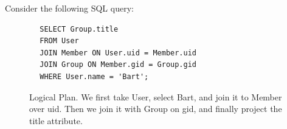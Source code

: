    \begin{example}
      Consider the following SQL query:
      \begin{lstlisting}
        SELECT Group.title
        FROM User
        JOIN Member ON User.uid = Member.uid
        JOIN Group ON Member.gid = Group.gid
        WHERE User.name = 'Bart';
      \end{lstlisting}

      \begin{figure}[H]
        \centering 
        \caption{Logical Plan. We first take User, select Bart, and join it to Member over uid. Then we join it with Group on gid, and finally project the title attribute.} 
        \label{fig:logical_plan}
      \end{figure}


\end{example}
